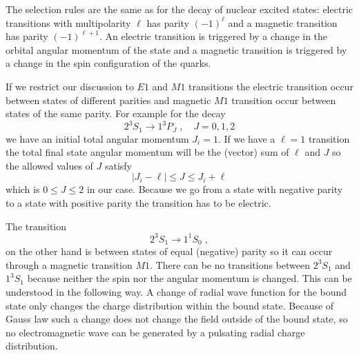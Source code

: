 \documentclass[12pt]{article}
\begin{document}
The selection rules are the same as for the decay of nuclear excited states: electric transitions with multipolarity $\ell$ has parity $(-1)^\ell$ and a magnetic transition has parity $(-1)^{\ell+1}$. An electric transition is triggered by a change in the orbital angular momentum of the state and a magnetic transition is triggered by a change in the spin configuration of the quarks.

If we restrict our discussion to $E1$ and $M1$ transitions the electric transition occur between states of different parities and magnetic $M1$ transition occur between states of the same parity. For example for the decay
\[2^{3}S_1\rightarrow  1^3P_{J}\;,\quad J=0,1,2\]
we have an initial total angular momentum $J_i=1$. If we have a $\ell=1$ transition the total final state angular momentum will be the (vector) sum of $\ell$ and $J$ so the allowed values of $J$ satisfy
\[|J_i-\ell|\leq J \leq J_i+\ell \]
which is $0\leq J\leq 2$ in our case. Because we go from a state with negative parity to a state with positive parity the transition has to be electric. 

The transition
\[2^{3}S_1\rightarrow  1^1S_0\;,\]
on the other hand is between states of equal (negative) parity so it can occur through a magnetic transition $M1$. There can be no transitions between $2^{3}S_1$ and $1^{3}S_1$ because neither the spin nor the angular momentum is changed. This can be understood in the following way. A change of radial wave function for the bound state only changes the charge distribution within the bound state. Because of Gauss law such a change does not change the field outside of the bound state, so no electromagnetic wave can be generated by a pulsating radial charge distribution.  
    
\end{document}
